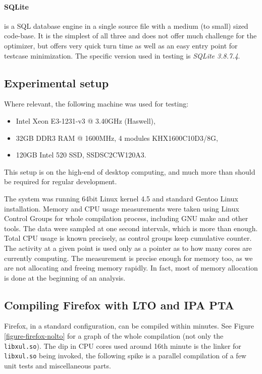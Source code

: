 \paragraph{SQLite} is a SQL database engine in a single source file with a
medium (to small) sized code-base. It is the simplest of all three and does not
offer much challenge for the optimizer, but offers very quick turn time as well
as an easy entry point for testcase minimization. The specific version used in
testing is {\it SQLite 3.8.7.4}.

\subsection{Experimental setup}

Where relevant, the following machine was used for testing:

\begin{itemize}
	\item Intel Xeon E3-1231-v3 @ 3.40GHz (Haswell),
	\item 32GB DDR3 RAM @ 1600MHz, 4 modules KHX1600C10D3/8G,
	\item 120GB Intel 520 SSD, SSDSC2CW120A3.
\end{itemize}

\noindent This setup is on the high-end of desktop computing, and much more than
should be required for regular development. 

The system was running 64bit Linux kernel 4.5 and standard Gentoo Linux
installation. Memory and CPU usage measurements were taken using Linux Control
Groups for whole compilation process, including GNU make and other tools. The
data were sampled at one second intervals, which is more than enough. Total CPU
usage is known precisely, as control groups keep cumulative counter. The
activity at a given point is used only as a pointer as to how many cores are
currently computing. The measurement is precise enough for memory too, as
we are not allocating and freeing memory rapidly. In fact, most of 
memory allocation is done at the beginning of an analysis.

\subsection{Compiling Firefox with LTO and IPA PTA}
\label{section-firefox-lto-pta}

Firefox, in a standard configuration, can be compiled within minutes. See Figure
\ref{figure-firefox-nolto} for a graph of the whole compilation (not only the
{\tt libxul.so}). The dip in CPU cores used around 16th minute is the linker for
{\tt libxul.so} being invoked, the following spike is a parallel compilation of a few
unit tests and miscellaneous parts.

